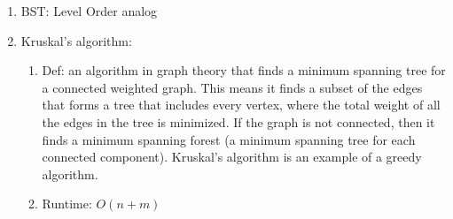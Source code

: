 \documentclass[12pt]{article}
\renewcommand{\=}[1]{\stackrel{#1}{=}} %
\theoremstyle{definition}
\theoremstyle{remark}
\begin{document}
\begin{enumerate}
\begin{enumerate}
\begin{enumerate}
      \item BST: Level Order analog

      \item Kruskal's algorithm:
        \begin{enumerate}
        \item Def: an algorithm in graph theory that finds a minimum spanning tree for a connected weighted graph. This means it finds a subset of the edges that forms a tree that includes every vertex, where the total weight of all the edges in the tree is minimized. If the graph is not connected, then it finds a minimum spanning forest (a minimum spanning tree for each connected component). Kruskal's algorithm is an example of a greedy algorithm.
        \item Runtime: $O(n+m)$
        \end{enumerate}


\end{enumerate}
\end{enumerate}
\end{enumerate}
\end{document}
